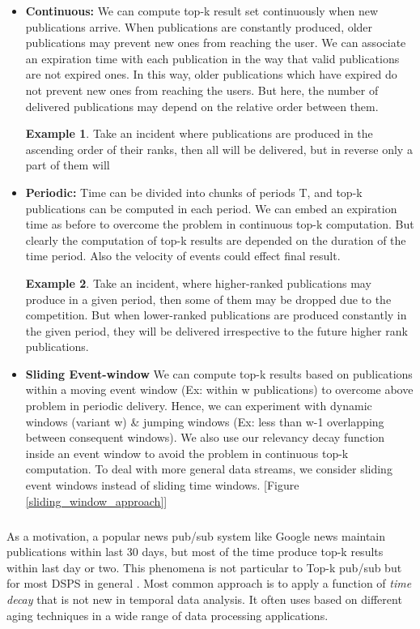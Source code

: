 \documentclass[a4paper,12pt,oneside]{book}
\theoremstyle{definition}
\newtheorem{example}{Example}[section]
\theoremstyle{remark}
\begin{document}
\begin{itemize}
\item \textbf{Continuous:} We can compute top-k result set continuously when new publications arrive. When publications are constantly produced, older publications may prevent new ones from reaching the user. We can associate an expiration time with each publication in the way that valid publications are not expired ones. In this way, older publications which have expired do not prevent new ones from reaching the users. But here, the number of delivered publications may depend on the relative order between them.
\begin{example}
Take an incident where publications are produced in the ascending order of their ranks, then all will be delivered, but in reverse only a part of them will
\end{example}
\item \textbf{Periodic:} Time can be divided into chunks of periods T, and top-k publications can be computed in each period. We can embed an expiration time as before to overcome the problem in continuous top-k computation. But clearly the computation of top-k results are depended on the duration of the time period. Also the velocity of events could effect final result.
\begin{example} 
Take an incident, where higher-ranked publications may produce in a given period, then some of them may be dropped due to the competition. But when lower-ranked publications are produced constantly in the given period, they will be delivered irrespective to the future higher rank publications.
\end{example}

\item \textbf{Sliding Event-window} We can compute top-k results based on publications within a moving event window (Ex: within w publications) to overcome above problem in periodic delivery. Hence, we can experiment with dynamic windows (variant w) \& jumping windows (Ex: less than w-1 overlapping between consequent windows). We also use our relevancy decay function inside an event window to avoid the problem in continuous top-k computation. To deal with more general data streams, we consider sliding event windows instead of sliding time windows. [Figure \ref{sliding_window_approach}]
\end{itemize}

\subparagraph*{}
As a motivation, a popular news pub/sub system like Google news maintain publications within last 30 days, but most of the time produce top-k results within last day or two. This phenomena is not particular to Top-k pub/sub but for most \ac{DSPS} in general \cite{Cormode2009}. Most common approach is to apply a function of \emph{time decay} that is not new in temporal data analysis. It often uses based on different aging techniques in a wide range of data processing applications.
\end{document}
